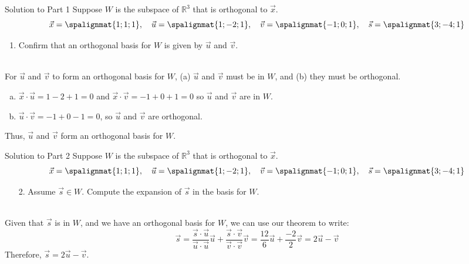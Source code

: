 \begin{frame}{Solution to Part 1}  
    \vspace{-6pt}
    Suppose $W$ is the subspace of $\mathbb R ^{3}$ that is orthogonal to $\vec x$. 
    $$\vec x = \spalignmat{1;1;1}, \quad \vec u = \spalignmat{1;-2;1}, \quad \vec v = \spalignmat{-1;0;1}, \quad \vec s = \spalignmat{3;-4;1}$$ \vspace{-12pt}
    \begin{enumerate}
        \item Confirm that an orthogonal basis for $W$ is given by $\vec u$ and $\vec v$.
    \end{enumerate}
    
    \pause 
    \\ \pause 
    For $\vec u$ and $\vec v$ to form an orthogonal basis for $W$, (a) $\vec u$ and $\vec v$ must be in $W$, and (b) they must be orthogonal.  \pause 
    \begin{enumerate}[a)]
        \item $\vec x \cdot \vec u = 1 -2 +1 = 0$ and $\vec x \cdot \vec v = -1 + 0 + 1 = 0 $ so $\vec u$ and $\vec v$ are in $W$. 
        \item $\vec u \cdot \vec v = -1 + 0 -1 = 0$, so $\vec u$ and $\vec v$ are orthogonal.
    \end{enumerate}
    \pause 
    Thus, $\vec u$ and $\vec v$ form an orthogonal basis for $W$. 
\end{frame}



\begin{frame}{Solution to Part 2}  
    \vspace{-6pt}
    Suppose $W$ is the subspace of $\mathbb R ^{3}$ that is orthogonal to $\vec x$. \pause 
    $$\vec x = \spalignmat{1;1;1}, \quad \vec u = \spalignmat{1;-2;1}, \quad \vec v = \spalignmat{-1;0;1}, \quad \vec s = \spalignmat{3;-4;1}$$ \vspace{-12pt} \pause 
    \begin{enumerate}
        \item[2.] Assume $\vec s \in W$. Compute the expansion of $\vec s$ in the basis for $W$.
    \end{enumerate}
    
    \vspace{12pt}
    \\ \pause 
    Given that $\vec s$ is in $W$, and we have an orthogonal basis for $W$, we can use our theorem to write: \pause 
    $$\vec s = \frac{\vec s \cdot \vec u}{\vec u \cdot \vec u}\vec u + \frac{\vec s \cdot \vec v}{\vec v \cdot \vec v}\vec v=\frac{12}{6}\vec u + \frac{-2}{2}\vec v = 2\vec u - \vec v$$ \pause 
    Therefore, $\vec s = 2\vec u - \vec v$. 
\end{frame}


